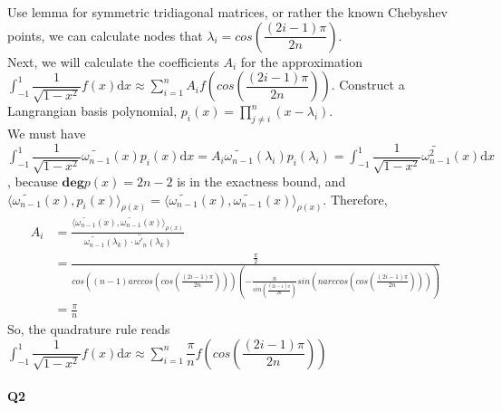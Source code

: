 \documentclass[11pt]{article}
\begin{document}
Use lemma for symmetric tridiagonal matrices, or rather the known Chebyshev points, we can calculate nodes that $\lambda_i=cos(\dfrac{(2i-1)\pi}{2n})$.\\
Next, we will calculate the coefficients $A_i$ for the approximation  $\int_{-1}^{1}\dfrac{1}{\sqrt{1-x^2}}f(x)\mathrm{d}x\approx\sum_{i=1}^{n}A_if(cos(\dfrac{(2i-1)\pi}{2n}))$.
Construct a Langrangian basis polynomial, $p_i(x)=\prod_{j\ne i}^{n}(x-\lambda_i)$. \\We must have $\int_{-1}^{1}\dfrac{1}{\sqrt{1-x^2}}\tilde{\omega_{n-1}}(x)p_i(x)\mathrm{d}x=A_i\tilde{\omega_{n-1}}(\lambda_i)p_i(\lambda_i)=\int_{-1}^{1}\dfrac{1}{\sqrt{1-x^2}}\tilde{\omega^2_{n-1}}(x)\mathrm{d}x$, because $\mathbf{deg}p(x)=2n-2$ is in the exactness bound, and $\langle\tilde{\omega_{n-1}}(x),p_i(x)\rangle_{\rho(x)}=\langle\tilde{\omega_{n-1}}(x),\tilde{\omega_{n-1}}(x)\rangle_{\rho(x)}.$
Therefore,
\begin{align}
	A_i&=\frac{\langle\tilde{\omega_{n-1}}(x),\tilde{\omega_{n-1}}(x)\rangle_{\rho(x)}}{\tilde{\omega_{n-1}}(\lambda_k)\cdot\tilde{\omega'_{n}}(\lambda_k)}\\
	&=\frac{\frac{\pi}{2}}{cos((n-1)arccos(cos(\frac{(2i-1)\pi}{2n})))(-\frac{n}{sin(\frac{(2i-1)\pi}{2n})}sin(narccos(cos(\frac{(2i-1)\pi}{2n}))))}\\
	&=\frac{\pi}{n}
\end{align}
So, the quadrature rule reads $\int_{-1}^{1}\dfrac{1}{\sqrt{1-x^2}}f(x)\mathrm{d}x\approx\sum_{i=1}^{n}\dfrac{\pi}{n}f(cos(\dfrac{(2i-1)\pi}{2n}))$
\paragraph{Q2}
\end{document}
